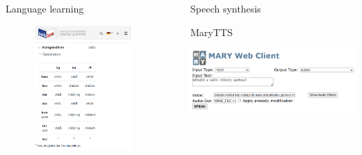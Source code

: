 \documentclass[final]{beamer}
\newlength{\sepwidth}
\newlength{\colwidth}
\newcommand{\separatorcolumn}{\begin{column}{\sepwidth}\end{column}}
\begin{document}
\begin{frame}[t]
\begin{columns}[t]
\begin{column}{\colwidth}
\begin{block}{Language learning}
    \begin{figure}
        \centering
        \includegraphics[width=0.7\colwidth]{soblex_klein.png}
        \label{fig:soblex}
    \end{figure}

  \end{block}

\end{column}

\separatorcolumn

\begin{column}{\colwidth}

  \begin{block}{Speech synthesis}


    MaryTTS

    \includegraphics[width=\colwidth]{marytts_small.png}


\end{block}
\end{column}
\end{columns}
\end{frame}
\end{document}
